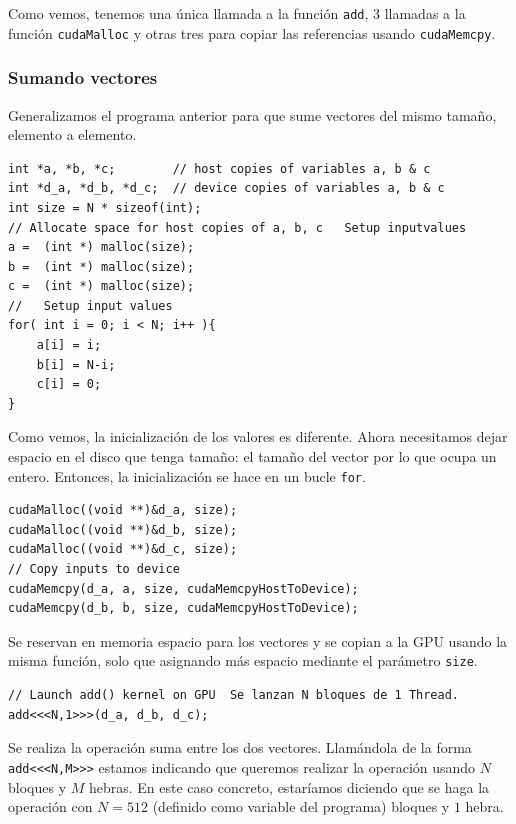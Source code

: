 \documentclass[11pt]{article}
\def\inline{\lstinline[basicstyle=\ttfamily,keywordstyle={}]}
\begin{document}
Como vemos, tenemos una única llamada a la función \inline{add}, $3$ llamadas a la función \inline{cudaMalloc} y otras tres para copiar las referencias usando \inline{cudaMemcpy}. 


\subsubsection{Sumando vectores}

Generalizamos el programa anterior para que sume vectores del mismo tamaño, elemento a elemento.

\begin{verbatim}
int *a, *b, *c;        // host copies of variables a, b & c
int *d_a, *d_b, *d_c;  // device copies of variables a, b & c
int size = N * sizeof(int);
// Allocate space for host copies of a, b, c   Setup inputvalues  
a =  (int *) malloc(size); 
b =  (int *) malloc(size); 
c =  (int *) malloc(size); 
//   Setup input values  
for( int i = 0; i < N; i++ ){
	a[i] = i;
  	b[i] = N-i;
	c[i] = 0;
}	
\end{verbatim}

Como vemos, la inicialización de los valores es diferente. Ahora necesitamos dejar espacio en el disco que tenga tamaño: el tamaño del vector por lo que ocupa un entero. Entonces, la inicialización se hace en un bucle \inline{for}.

\begin{verbatim}
cudaMalloc((void **)&d_a, size);
cudaMalloc((void **)&d_b, size);
cudaMalloc((void **)&d_c, size);
// Copy inputs to device
cudaMemcpy(d_a, a, size, cudaMemcpyHostToDevice);
cudaMemcpy(d_b, b, size, cudaMemcpyHostToDevice);
\end{verbatim}

Se reservan en memoria espacio para los vectores y se copian a la GPU usando la misma función, solo que asignando más espacio mediante el parámetro \inline{size}.

\begin{verbatim}
// Launch add() kernel on GPU  Se lanzan N bloques de 1 Thread.
add<<<N,1>>>(d_a, d_b, d_c);
\end{verbatim}

Se realiza la operación suma entre los dos vectores. Llamándola de la forma \inline{add<<<N,M>>>} estamos indicando que queremos realizar la operación usando $N$ bloques y $M$ hebras. En este caso concreto, estaríamos diciendo que se haga la operación con $N = 512$ (definido como variable del programa) bloques y $1$ hebra.
\end{document}
